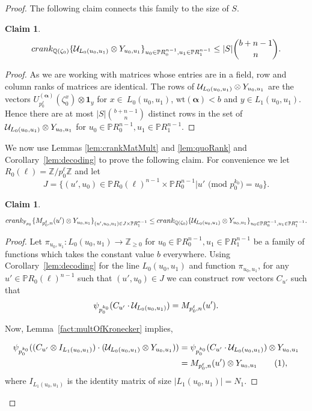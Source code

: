 \documentclass[11pt]{article}
\numberwithin{equation}{section}
\newcommand\numberthis{\addtocounter{equation}{1}\tag{\theequation}}
\newtheorem{claim}[thm]{Claim}
\def\F{{\mathbb{F}}}
\def\Q{{\mathbb{Q}}}
\def\Z{{\mathbb{Z}}}
\def\P{{\mathbb{P}}}
\def\cU{{\cal U}}
\def\Ind{{\mathbf{1}}}
\def\balpha{{\bm \alpha}}
\def\crank{\textsf{crank}}
\begin{document}
\begin{proof}
The following claim connects this family to the size of $S$.

\begin{claim}\label{claim:set1}
{\em $$\crank_{\Q(\zeta_0)} \{\cU_{L_{0}(u_0,u_1)}\otimes Y_{u_0,u_1}\}_{u_0\in \P R_0^{n-1},u_1\in \P R_1^{n-1}} \le |S|\binom{b+n-1}{n}.$$}
\end{claim}
\begin{proof}
As we are working with matrices whose entries are in a field, row and column ranks of matrices are identical. The rows of $\cU_{L_{0}(u_0,u_1)}\otimes Y_{u_0,u_1}$ are the vectors $U_{p_0^\ell}^{(\balpha)}(\zeta_0^x)\otimes \Ind_y$ for $x\in~L_0(u_0,u_1)$, $\text{wt}(\balpha)<b$ and $y\in L_1(u_0,u_1)$. Hence there are at most $|S|\binom{b+n-1}{n}$ distinct rows in the set of $\cU_{L_{0}(u_0,u_1)}\otimes Y_{u_0,u_1}$ for $u_0\in \P R_0^{n-1},u_1\in \P R_1^{n-1}$.
\end{proof}

We now use Lemmas \ref{lem:crankMatMult} and \ref{lem:quoRank} and Corollary~\ref{lem:decoding} to prove the following claim. For convenience we let $R_0(\ell)=\Z/p_0^\ell\Z$ and let 
$$J=\{(u',u_0)\in \P R_0(\ell)^{n-1}\times \P R_0^{n-1}| u' \text{ (mod }p_0^{k_0}\text{)}=u_0\}.$$

\begin{claim}\label{claim:set2}
{\em $$\crank_{\F_{p_0}} \{M_{p_0^\ell,n}(u')\otimes Y_{u_0,u_1}\}_{(u',u_0,u_1)\in J\times \P R_1^{n-1}}\le \crank_{\Q(\zeta_0)} \{\cU_{L_{0}(u_0,u_1)}\otimes Y_{u_0,u_1}\}_{u_0\in \P R_0^{n-1},u_1\in \P R_1^{n-1}}.$$}
\end{claim}
\begin{proof}
Let $\pi_{u_0,u_1}:L_0(u_0,u_1)\rightarrow \Z_{\ge 0}$ for $u_0\in \P R_0^{n-1},u_1\in \P R_1^{n-1}$ be a family of functions which takes the constant value $b$ everywhere. Using Corollary~\ref{lem:decoding} for the line $L_0(u_0,u_1)$ and function $\pi_{u_0,u_1}$, for any $u' \in \P R_0(\ell)^{n-1}$ such that $(u',u_0)\in J$ we can construct row vectors $C_{u'}$ such that 
$$\psi_{p_0^{k_0}}(C_{u'}\cdot \cU_{L_{0}(u_0,u_1)})=M_{p_0^\ell,n}(u').$$ 

Now, Lemma~\ref{fact:multOfKronecker} implies,

\begin{align*}\label{eq:long}
\psi_{p_0^{k_0}}((C_{u'}\otimes I_{L_1(u_0,u_1)})\cdot (\cU_{L_{0}(u_0,u_1)}\otimes Y_{u_0,u_1}))&= \psi_{p_0^{k_0}}(C_{u'}\cdot \cU_{L_{0}(u_0,u_1)})\otimes Y_{u_0,u_1}\\
&= M_{p_0^{\ell},n}(u')\otimes Y_{u_0,u_1} \numberthis,
\end{align*}
where $I_{L_1(u_0,u_1)}$ is the identity matrix of size $|L_1(u_0,u_1)|=N_1$.


\end{proof}
\end{proof}
\end{document}
